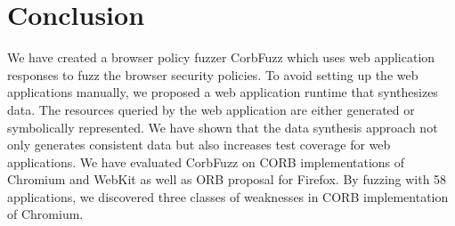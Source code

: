 \documentclass[10pt,conference]{IEEEtran}
\begin{document}
\section{Conclusion}
\label{sec:conclusion}
We have created a browser policy fuzzer CorbFuzz which uses web application responses to fuzz the browser security policies. To avoid setting up the web applications manually, we proposed a web application runtime that synthesizes data. The resources queried by the web application are either generated or symbolically represented. We have shown that the data synthesis approach not only generates consistent data but also increases test coverage for web applications. We have evaluated CorbFuzz on CORB implementations of Chromium and WebKit as well as ORB proposal for Firefox. By fuzzing with 58 applications, we discovered three classes of weaknesses in CORB implementation of Chromium. %




\end{document}
